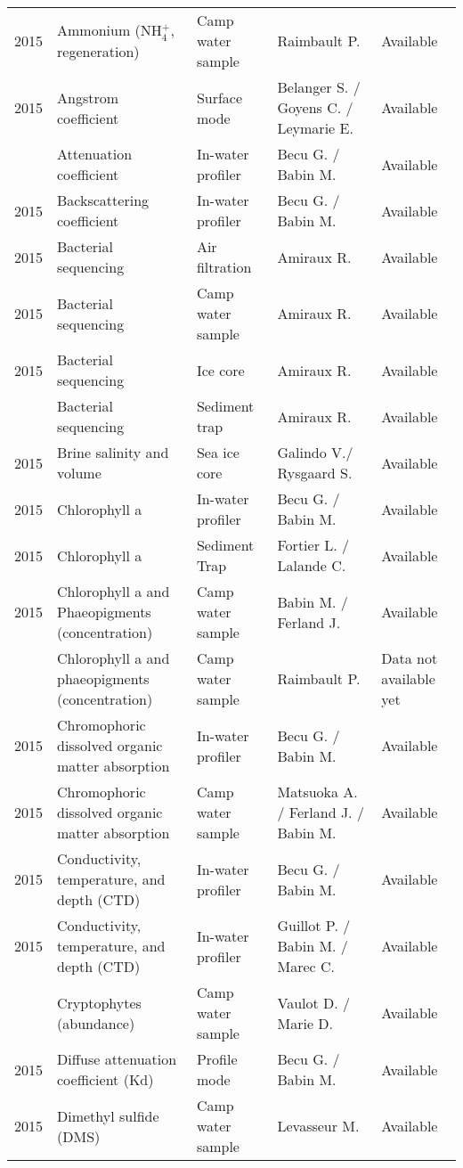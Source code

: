 \documentclass[]{article}
\begin{document}
\begin{landscape}
\begin{longtable}[t]{rllll}
2015 & Ammonium (NH$^+_4$, regeneration) & Camp water sample & Raimbault P. & Available\\
2015 & Angstrom coefficient & Surface mode & Belanger S. / Goyens C. / Leymarie E. & Available\\
\addlinespace
2015 & Attenuation coefficient & In-water profiler & Becu G. / Babin M. & Available\\
2015 & Backscattering coefficient & In-water profiler & Becu G. / Babin M. & Available\\
2015 & Bacterial sequencing & Air filtration & Amiraux R. & Available\\
2015 & Bacterial sequencing & Camp water sample & Amiraux R. & Available\\
2015 & Bacterial sequencing & Ice core & Amiraux R. & Available\\
\addlinespace
2015 & Bacterial sequencing & Sediment trap & Amiraux R. & Available\\
2015 & Brine salinity and volume & Sea ice core & Galindo V./ Rysgaard S. & Available\\
2015 & Chlorophyll a & In-water profiler & Becu G. / Babin M. & Available\\
2015 & Chlorophyll a & Sediment Trap & Fortier L. / Lalande C. & Available\\
2015 & Chlorophyll a and Phaeopigments (concentration) & Camp water sample & Babin M. / Ferland J. & Available\\
\addlinespace
2015 & Chlorophyll a and phaeopigments (concentration) & Camp water sample & Raimbault P. & Data not available yet\\
2015 & Chromophoric dissolved organic matter absorption & In-water profiler & Becu G. / Babin M. & Available\\
2015 & Chromophoric dissolved organic matter absorption & Camp water sample & Matsuoka A. / Ferland J. / Babin M. & Available\\
2015 & Conductivity, temperature, and depth (CTD) & In-water profiler & Becu G. / Babin M. & Available\\
2015 & Conductivity, temperature, and depth (CTD) & In-water profiler & Guillot P. / Babin M. / Marec C. & Available\\
\addlinespace
2015 & Cryptophytes (abundance) & Camp water sample & Vaulot D. / Marie D. & Available\\
2015 & Diffuse attenuation coefficient (Kd) & Profile mode & Becu G. / Babin M. & Available\\
2015 & Dimethyl sulfide (DMS) & Camp water sample & Levasseur M. & Available\\

\end{longtable}
\end{landscape}
\end{document}
